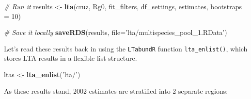 \documentclass[
]{book}
\newenvironment{Shaded}{\begin{snugshade}}{\end{snugshade}}
\newcommand{\CommentTok}[1]{\textcolor[rgb]{0.56,0.35,0.01}{\textit{#1}}}
\newcommand{\DataTypeTok}[1]{\textcolor[rgb]{0.13,0.29,0.53}{#1}}
\newcommand{\DecValTok}[1]{\textcolor[rgb]{0.00,0.00,0.81}{#1}}
\newcommand{\FloatTok}[1]{\textcolor[rgb]{0.00,0.00,0.81}{#1}}
\newcommand{\KeywordTok}[1]{\textcolor[rgb]{0.13,0.29,0.53}{\textbf{#1}}}
\newcommand{\NormalTok}[1]{#1}
\newcommand{\OperatorTok}[1]{\textcolor[rgb]{0.81,0.36,0.00}{\textbf{#1}}}
\newcommand{\OtherTok}[1]{\textcolor[rgb]{0.56,0.35,0.01}{#1}}
\newcommand{\StringTok}[1]{\textcolor[rgb]{0.31,0.60,0.02}{#1}}
\begin{document}
\begin{Shaded}
\begin{Highlighting}[]
\CommentTok{# Run it}
\NormalTok{results <-}\StringTok{ }\KeywordTok{lta}\NormalTok{(cruz, Rg0, }
\NormalTok{               fit_filters, df_settings, estimates, }
               \DataTypeTok{bootstraps =} \DecValTok{10}\NormalTok{)}

\CommentTok{# Save it locally}
\KeywordTok{saveRDS}\NormalTok{(results, }\DataTypeTok{file=}\StringTok{'lta/multispecies_pool_1.RData'}\NormalTok{)}
\end{Highlighting}
\end{Shaded}

Let's read these results back in using the \texttt{LTabundR} function \texttt{lta\_enlist()}, which stores LTA results in a flexible list structure.

\begin{Shaded}
\begin{Highlighting}[]
\NormalTok{ltas <-}\StringTok{ }\KeywordTok{lta_enlist}\NormalTok{(}\StringTok{'lta/'}\NormalTok{)}
\end{Highlighting}
\end{Shaded}

As these results stand, 2002 estimates are stratified into 2 separate regions:

\begin{Shaded}
\end{Shaded}
\end{document}
